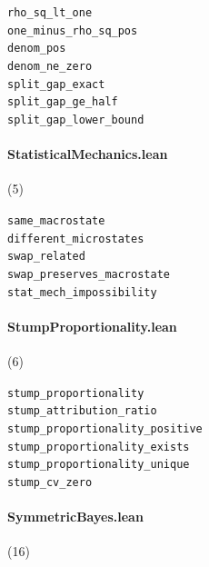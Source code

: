 {\footnotesize
\texttt{rho\_sq\_lt\_one}\\
\texttt{one\_minus\_rho\_sq\_pos}\\
\texttt{denom\_pos}\\
\texttt{denom\_ne\_zero}\\
\texttt{split\_gap\_exact}\\
\texttt{split\_gap\_ge\_half}\\
\texttt{split\_gap\_lower\_bound}\\
}

\paragraph{StatisticalMechanics.lean} (5)

{\footnotesize
\texttt{same\_macrostate}\\
\texttt{different\_microstates}\\
\texttt{swap\_related}\\
\texttt{swap\_preserves\_macrostate}\\
\texttt{stat\_mech\_impossibility}\\
}

\paragraph{StumpProportionality.lean} (6)

{\footnotesize
\texttt{stump\_proportionality}\\
\texttt{stump\_attribution\_ratio}\\
\texttt{stump\_proportionality\_positive}\\
\texttt{stump\_proportionality\_exists}\\
\texttt{stump\_proportionality\_unique}\\
\texttt{stump\_cv\_zero}\\
}

\paragraph{SymmetricBayes.lean} (16)

